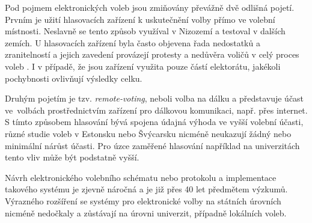 Pod pojmem elektronických voleb jsou zmiňovány převážně dvě odlišná pojetí. Prvním je užití hlasovacích zařízení k uskutečnění volby přímo ve volební místnosti. Neslavně se tento způsob využíval v Nizozemí \cite{GoldsmithCaseSR} a testoval v dalších zemích. U hlasovacích zařízení byla často objevena řada nedostatků a zranitelností a jejich zavedení provázejí protesty a nedůvěra voličů v celý proces voleb \cite{Valasek2020}. I v případě, že jsou zařízení využita pouze částí elektorátu, jakékoli pochybnosti ovlivňují výsledky celku.

Druhým pojetím je tzv. \textit{remote-voting}, neboli volba na dálku a představuje účast ve~volbách prostřednictvím zařízení  pro dálkovou komunikaci, např. přes internet. S tímto způsobem hlasování bývá spojena údajná výhoda ve vyšší volební účasti, různé studie voleb v Estonsku \cite{estoniaTurnout} nebo Švýcarsku \cite{swissTurnout} nicméně neukazují žádný nebo minimální nárůst účasti. Pro úzce zaměřené hlasování například na univerzitách tento vliv může být podstatně vyšší.

Návrh elektronického volebního schématu nebo protokolu a implementace takového systému je zjevně náročná a je již přes 40 let předmětem výzkumů. Výrazného rozšíření se systémy pro elektronické volby na státních úrovních nicméně nedočkaly a zůstávají na úrovni univerzit, případně lokálních voleb.

